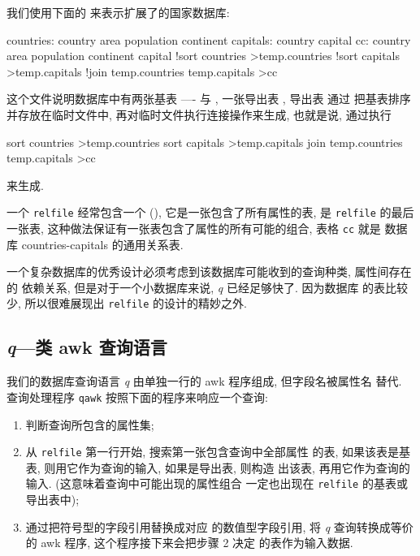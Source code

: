 我们使用下面的  来表示扩展了的国家数据库:
\begin{file}
    countries:
        country
        area
        population
        continent
    capitals:
        country
        capital
    cc:
        country
        area
        population
        continent
        capital
        !sort countries >temp.countries
        !sort capitals >temp.capitals
        !join temp.countries temp.capitals >cc
\end{file}
这个文件说明数据库中有两张基表 ----  与
, 一张导出表 , 导出表  通过 
把基表排序并存放在临时文件中, 再对临时文件执行连接操作来生成, 也就是说, 
 通过执行
\begin{shell}
    sort countries >temp.countries
    sort capitals >temp.capitals
    join temp.countries temp.capitals >cc
\end{shell}
来生成.

一个 \texttt{relfile} 经常包含一个  (), 它是一张包含了所有属性的表, 是 \texttt{relfile} 的最后一张表,
这种做法保证有一张表包含了属性的所有可能的组合, 表格 \texttt{cc} 就是 
数据库 countries-capitals 的通用关系表.

一个复杂数据库的优秀设计必须考虑到该数据库可能收到的查询种类, 属性间存在的
依赖关系, 但是对于一个小数据库来说, \textit{q} 已经足够快了. 因为数据库
的表比较少, 所以很难展现出 \texttt{relfile} 的设计的精妙之外.

\subsection{\textit{q}---类 awk 查询语言}
\label{subsec:q_an_awk_like_query_language}

我们的数据库查询语言 \textit{q} 由单独一行的 awk 程序组成, 但字段名被属性名
替代. 查询处理程序 \texttt{qawk} 按照下面的程序来响应一个查询:
\begin{enumerate}
	\item 判断查询所包含的属性集;
	\item 从 \texttt{relfile} 第一行开始, 搜索第一张包含查询中全部属性
	的表, 如果该表是基表, 则用它作为查询的输入, 如果是导出表, 则构造
	出该表, 再用它作为查询的输入. (这意味着查询中可能出现的属性组合
	一定也出现在 \texttt{relfile} 的基表或导出表中);
	\item 通过把符号型的字段引用替换成对应 的数值型字段引用, 将
	\textit{q} 查询转换成等价的 awk 程序, 这个程序接下来会把步骤 2 决定
	的表作为输入数据.
\end{enumerate}

